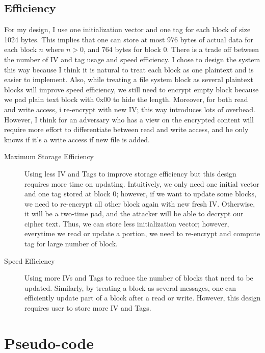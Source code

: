 \documentclass[a4paper,10pt]{article}
\begin{document}
\subsection{Efficiency} %
\label{sub:efficency}
For my design, I use one initialization vector and one tag for each block of size 1024 bytes. This implies that one can store at most 976 bytes of actual data for each block $n$ where $n>0$, and 764 bytes for block 0. There is a trade off between the number of IV and tag usage and speed efficiency. I chose to design the system this way because I think it is natural to treat each block as one plaintext and is easier to implement. Also, while treating a file system block as several plaintext blocks will improve speed efficiency, we still need to encrypt empty block because we pad plain text block with 0x00 to hide the length. Moreover, for both read and write access, i re-encrypt with new IV; this way introduces lots of overhead. However, I think for an adversary who has a view on the encrypted content will require more effort to differentiate between read and write access, and he only knows if it's a write access if new file is added.  
\begin{description}
  \item[Maximum Storage Efficiency] Using less IV and Tags to improve storage efficiency but this design requires more time on updating. Intuitively, we only need one initial vector and one tag stored at block 0; however, if we want to update some blocks, we need to re-encrypt all other block again with new fresh IV. Otherwise, it will be a two-time pad, and the attacker will be able to decrypt our cipher text. Thus, we can store less initialization vector; however, everytime we read or update a portion, we need to re-encrypt and compute tag for large number of block.
  \item[Speed Efficiency] Using more IVs and Tags to reduce the number of blocks that need to be updated. Similarly, by treating a block as several messages, one can efficiently update part of a block after a read or write. However, this design requires user to store more IV and Tags.
\end{description}

\section{Pseudo-code}
\end{document}
